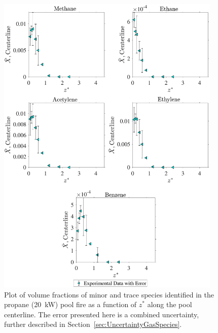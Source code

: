 \documentclass[12pt]{article}
\begin{document}
\begin{figure}[!h]
	\centering
\includegraphics[width=10.75cm,keepaspectratio]{Propane 20KW_Inter_MOL_FRAC_Plot.pdf}
	\caption[Volume fractions of minor and trace species in the propane (20kW) plume]{Plot of volume fractions of minor and trace species identified in the propane (20~kW) pool fire as a function of $z^{*}$ along the pool centerline. The error presented here is a combined uncertainty, further described in Section~\ref{sec:UncertaintyGasSpecies}.}
	\label{fig:Propane20kW_VOL_Frac_Inter}
\end{figure}
\clearpage

\pagebreak
\end{document}
